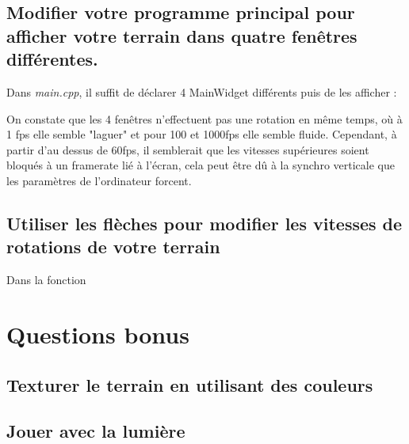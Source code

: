 \documentclass[a4paper,11pt]{report}
\begin{document}
	\subsection{Modifier votre programme principal pour afficher votre terrain dans quatre fenêtres différentes.}
	Dans \textit{main.cpp}, il suffit de déclarer 4 MainWidget différents puis de les afficher :
			
	On constate que les 4 fenêtres n'effectuent pas une rotation en même temps, où à 1 fps elle semble "laguer" et pour 100 et 1000fps elle semble fluide.
	\hfill
	\pagebreak
	Cependant, à partir d'au dessus de 60fps, il semblerait que les vitesses supérieures soient bloqués à un framerate lié à l'écran, cela peut être dû à la synchro verticale que les paramètres de l'ordinateur forcent.
	
	\subsection{Utiliser les flèches pour modifier les vitesses de rotations de votre terrain}
	Dans la fonction \texttt{}
    
    \pagebreak
    \section{Questions bonus}
    \subsection{Texturer le terrain en utilisant des couleurs}
    
    \subsection{Jouer avec la lumière}
\end{document}
